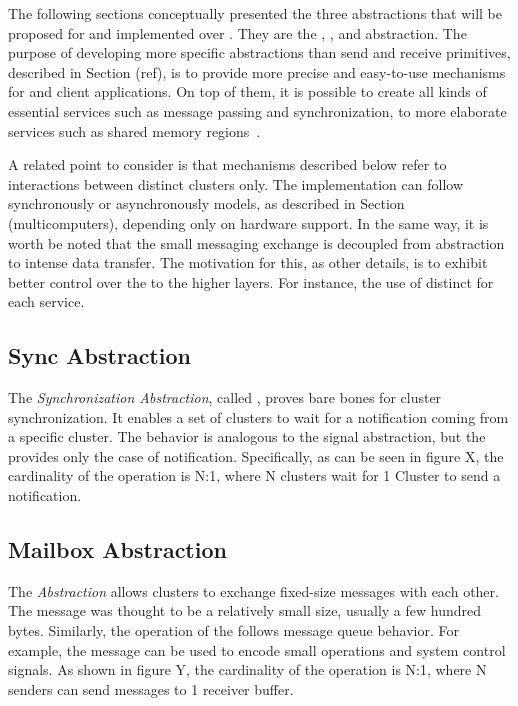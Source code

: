 	The following sections conceptually presented the three abstractions
	that will be proposed for \hal and implemented over \mppa.
	They are the \sync, \mailbox, and \portal abstraction.
	The purpose of developing more specific abstractions than
	send and receive primitives, described in Section (ref),
	is to provide more precise and easy-to-use mechanisms for
	\os and client applications.
	On top of them, it is possible to create all kinds of essential
	services such as message passing and synchronization,
	to more elaborate services such as shared memory regions~\cite{rem}.

	A related point to consider is that mechanisms described below refer
	to interactions between distinct clusters only.
	The implementation can follow synchronously or asynchronously models,
	as described in Section (multicomputers), depending only on hardware support.
	In the same way, it is worth be noted that the small messaging exchange
	is decoupled from abstraction to intense data transfer.
	The motivation for this, as other details, is to exhibit better control
	over the \qos to the higher layers.
	For instance, the use of distinct \nocs for each service.

		\subsection{Sync Abstraction}

			The \textit{Synchronization Abstraction}, called \sync, proves bare bones
			for cluster synchronization.
			It enables a set of clusters to wait for a notification coming from a
			specific cluster.
			The behavior is analogous to the \posix signal abstraction, but the \sync
			provides only the case of notification.
			Specifically, as can be seen in figure X, the cardinality of the operation
			is N:1, where N clusters wait for 1 Cluster to send a notification.

		\subsection{Mailbox Abstraction}

			The \textit{\mailbox Abstraction} allows clusters to exchange fixed-size
			messages with each other.
			The message was thought to be a relatively small size, usually a few hundred bytes.
			Similarly, the operation of the \mailbox follows \posix message queue behavior.
			For example, the message can be used to encode small operations and system
			control signals.
			As shown in figure Y, the cardinality of the operation is N:1, where N senders
			can send messages to 1 receiver buffer.

